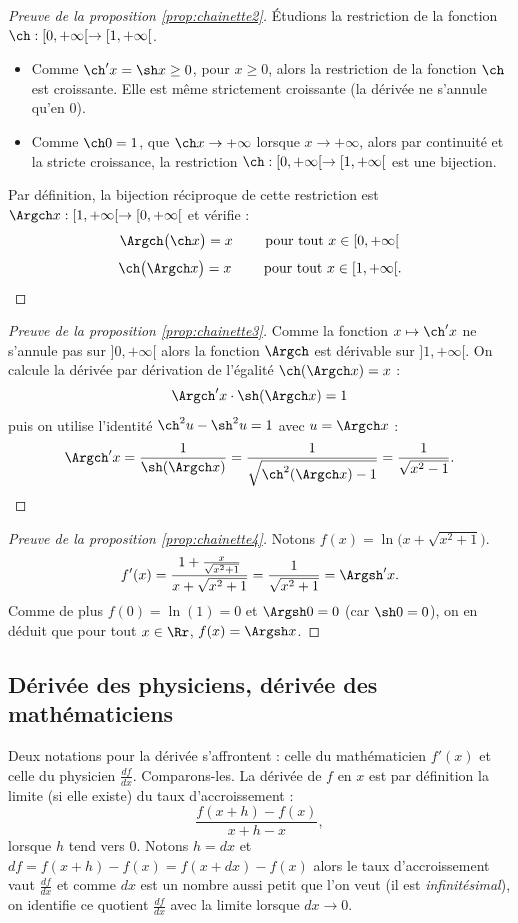 \documentclass[class=report,crop=false]{standalone}
\begin{document}
\begin{proof}[Preuve de la proposition \ref{prop:chainette2}]
\'Etudions la restriction de la fonction $\ch : [0,+\infty[ \to [1,+\infty[$.
\begin{itemize}
  \item Comme $\ch' x = \sh x \ge 0$, pour $x\ge 0$, alors la restriction de la fonction $\ch$ est croissante.
  Elle est même strictement croissante (la dérivée ne s'annule qu'en $0$).
  
  \item Comme $\ch 0 =1$, que $\ch x \to +\infty$ lorsque $x \to +\infty$,
  alors par continuité et la stricte croissance, la restriction $\ch : [0,+\infty[ \to [1,+\infty[$
  est une bijection.
\end{itemize}
Par définition, la bijection réciproque de cette restriction est $\Argch x : [1,+\infty[ \to [0,+\infty[$
et vérifie :
$$\Argch\big(\ch x\big) = x \qquad \text{ pour tout } x \in [0,+\infty[$$
$$\ch\big(\Argch x\big) = x \qquad \text{ pour tout } x \in [1,+\infty[.$$
\end{proof}


\begin{proof}[Preuve de la proposition \ref{prop:chainette3}]
Comme la fonction $x \mapsto \ch'x$  ne s'annule pas sur $]0,+\infty[$
alors la fonction $\Argch$ est dérivable sur $]1,+\infty[$.
On calcule la dérivée par dérivation de l'égalité $\ch(\Argch x) = x$ :
$$\Argch' x \cdot \sh(\Argch x) = 1$$
puis on utilise l'identité $\ch^2 u - \sh^2 u = 1$ avec $u = \Argch x$ :
$$\Argch' x = \frac{1}{\sh(\Argch x)} = \frac{1}{\sqrt{\ch^2(\Argch x)-1}}
= \frac{1}{\sqrt{x^2-1}}.$$  
\end{proof}


\begin{proof}[Preuve de la proposition \ref{prop:chainette4}]
Notons $f(x)=\ln\big(x+ \sqrt{x^2+1}\big)$. 
   $$f'(x) = \frac{1+\frac{x}{\sqrt{x^2+1}}}{x+ \sqrt{x^2+1}} = \frac{1}{\sqrt{x^2+1}} = \Argsh' x.$$ 
  Comme de plus $f(0)=\ln(1)=0$ et $\Argsh 0 = 0$ (car $\sh 0 = 0$), on en déduit que pour tout
  $x\in \Rr$, $f(x) = \Argsh x$.
\end{proof}


\subsection{Dérivée des physiciens, dérivée des mathématiciens}

Deux notations pour la dérivée s'affrontent : celle du mathématicien $f'(x)$
et celle du physicien $\frac{df}{dx}$. Comparons-les.
La dérivée de $f$ en $x$ est par définition la limite (si elle existe) du taux d'accroissement :
$$\frac{f(x+h)-f(x)}{x+h-x},$$
lorsque $h$ tend vers $0$.
Notons $h = dx$ et $df = f(x+h)-f(x) = f(x+dx)-f(x)$ alors le taux d'accroissement vaut
$\frac{df}{dx}$ et comme $dx$ est un nombre aussi petit que l'on veut (il est \emph{infinitésimal}),
on identifie ce quotient $\frac{df}{dx}$ avec la limite lorsque $dx \to 0$.
\end{document}
